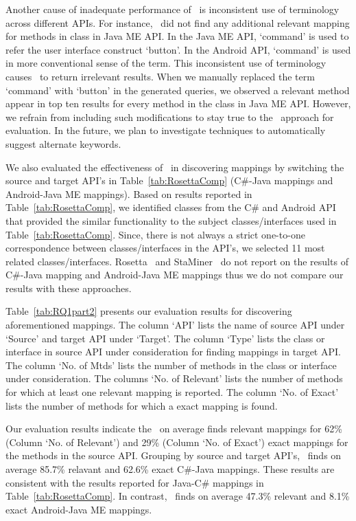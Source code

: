 Another cause of inadequate performance of \tool\ is 
inconsistent use of terminology across different APIs.
For instance, \tool\ did not find any additional relevant mapping for methods in  class in Java ME API.
In the Java ME API, `command' is used to refer the user interface construct `button'.
In the Android API, `command' is used in more conventional sense of the term.
This inconsistent use of terminology causes \tool\ to return irrelevant results. 
When we manually replaced the term `command' with `button' in the generated queries,
we observed a relevant method appear in top ten results for every method in the  class in Java ME API.
However, we refrain from including such modifications to stay true to the \tool\ approach for evaluation.
In the future, we plan to investigate techniques to automatically suggest alternate keywords.

We also evaluated the effectiveness of \tool\ in discovering mappings by switching the source and target API's in Table~\ref{tab:RosettaComp} (C\#-Java mappings and Android-Java ME mappings).
Based on results reported in Table~\ref{tab:RosettaComp}, we identified classes from the C\# and Android API that provided the similar functionality to the subject classes/interfaces used in Table~\ref{tab:RosettaComp}.
Since, there is not always a strict one-to-one correspondence between classes/interfaces in the API's, we selected 11 most related classes/interfaces.
Rosetta~\cite{Gokhale2013ICSE} and StaMiner~\cite{nguyen2014statistical} do not report on the results of C\#-Java mapping and Android-Java ME mappings thus we do not compare our results with these approaches.

Table~\ref{tab:RQ1part2} presents our evaluation results for discovering aforementioned mappings. 
The column `API' lists the name of source API under `Source' and target API under `Target'. 
The column `Type' lists the class or interface in source API
under consideration for finding mappings in target API.
The column `No. of Mtds' lists the number of methods in the class or interface under consideration.
The columns `No. of Relevant' lists the number of methods for which at least one relevant mapping is reported.
The column `No. of Exact' lists the number of methods for which a exact mapping is found.


Our evaluation results indicate the \tool\ on average finds relevant mappings for 62\% (Column `No. of Relevant') and 29\% (Column `No. of Exact') exact mappings for the methods in the source API.
Grouping by source and target API's, \tool\ finds on average 85.7\% relavant and 62.6\% exact C\#-Java mappings.
These results are consistent with the results reported for Java-C\# mappings in Table~\ref{tab:RosettaComp}.
In contrast, \tool\ finds on average 47.3\% relevant and 8.1\% exact Android-Java ME mappings.


